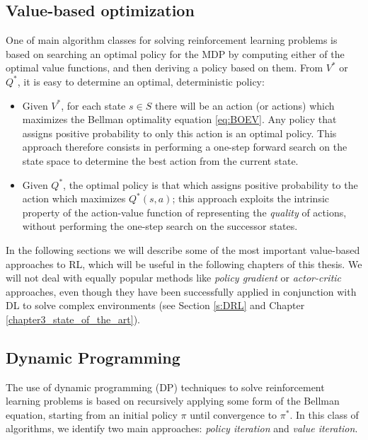 \subsection{Value-based optimization} \label{s:value_based_optimization}
One of main algorithm classes for solving reinforcement learning problems
is based on searching an optimal policy for the MDP by computing either 
of the optimal value functions, and then deriving a policy based on them.
From $V^*$ or $Q^*$, it is easy to determine an optimal, deterministic policy:
\begin{itemize}
    \item Given $V^*$, for each state $s \in S$ there will be an action (or 
    actions) which maximizes the Bellman optimality equation \eqref{eq:BOEV}. 
    Any policy that assigns positive probability to only this action is an 
    optimal policy.
    This approach therefore consists in performing a one-step forward search on 
    the state space to determine the best action from the current state.
    \item Given $Q^*$, the optimal policy is that which assigns positive 
    probability to the action which maximizes $Q^*(s, a)$; this approach 
    exploits the intrinsic property of the action-value function of representing 
    the \textit{quality} of actions, without performing the one-step search 
    on the successor states. 
\end{itemize}

In the following sections we will describe some of the most important 
value-based approaches to RL, which will be useful in the following chapters of 
this thesis. 
We will not deal with equally popular methods like \textit{policy gradient} or 
\textit{actor-critic} approaches, even though they have been successfully 
applied in conjunction with DL to solve complex environments (see Section 
\ref{s:DRL} and Chapter \ref{chapter3_state_of_the_art}).

\subsection{Dynamic Programming}
The use of dynamic programming (DP) techniques to solve reinforcement learning 
problems is based on recursively applying some form of the Bellman equation, 
starting from an initial policy $\pi$ until convergence to $\pi^*$.
In this class of algorithms, we identify two main approaches: \textit{policy 
iteration} and \textit{value iteration}.

